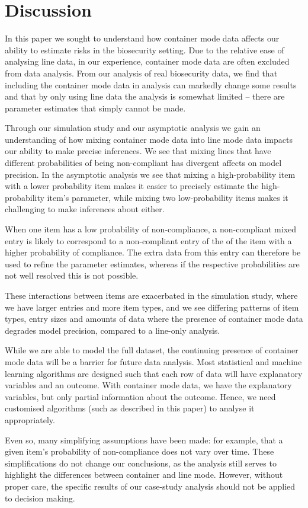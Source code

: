 \documentclass[useAMS,usenatbib,referee]{biom}
\newif\ifproofread
\newcommand{\rev}[1]{%
\ifproofread
\hl{#1}%
\else
#1%
\fi
}
\begin{document}
\section{Discussion}

In this paper we sought to understand how container mode data affects our ability to estimate risks in the biosecurity setting. Due to the relative ease of analysing line data, in our experience, container mode data are often excluded from data analysis. From our analysis of real biosecurity data, we find that including the container mode data in analysis can markedly change some results and that by only using line data the analysis is somewhat limited -- there are parameter estimates that simply cannot be made. 

Through our simulation study and our asymptotic analysis we gain an understanding of how mixing container mode data into line mode data impacts our ability to make precise inferences. We see that mixing lines that have different probabilities of being non-compliant has divergent affects on model precision. In the asymptotic analysis we see that mixing a high-probability item with a lower probability item makes it easier to precisely estimate the high-probability item's parameter, while mixing two low-probability items makes it challenging to make inferences about either. \rev{When one item has a low probability of non-compliance, a non-compliant mixed entry is likely to correspond to a non-compliant entry of the of the item with a higher probability of compliance.  The extra data from this entry can therefore be used to refine the parameter estimates, whereas if the respective probabilities are not well resolved this is not possible.} These interactions between items are exacerbated in the simulation study, where we have larger entries and more item types, and we see differing patterns of item types, entry sizes and amounts of data where the presence of container mode data degrades model precision, compared to a line-only analysis. 

While we are able to model the full dataset, the continuing presence of container mode data will be a barrier for future data analysis. Most statistical and machine learning algorithms are designed such that each row of data will have explanatory variables and an outcome. With container mode data, we have the explanatory variables, but only partial information about the outcome. Hence, we need customised algorithms (such as described in this paper) to analyse it appropriately. \rev{Even so, many simplifying assumptions have been made: for example, that a given item's probability of non-compliance does not vary over time. These simplifications do not change our conclusions, as the analysis still serves to highlight the differences between container and line mode. However, without proper care, the specific results of our case-study analysis should not be applied to decision making.} %
\end{document}
